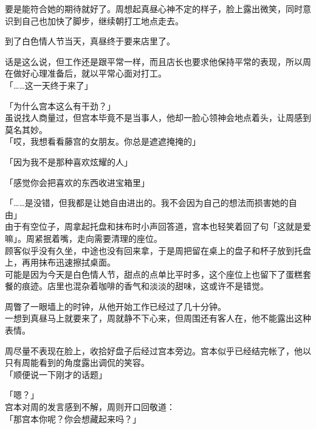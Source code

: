 要是能符合她的期待就好了。周想起真昼心神不定的样子，脸上露出微笑，同时意识到自己也加快了脚步，继续朝打工地点走去。\\

\vspace{2\baselineskip}

到了白色情人节当天，真昼终于要来店里了。

话是这么说，但工作还是跟平常一样，而且店长也要求他保持平常的表现，所以周在做好心理准备后，就以平常心面对打工。\\

「……这一天终于来了」

「为什么宫本这么有干劲？」\\

虽说找人商量过，但宫本毕竟不是当事人，他却一脸心领神会地点着头，让周感到莫名其妙。\\

「哎，我想看看藤宫的女朋友。你总是遮遮掩掩的」

「因为我不是那种喜欢炫耀的人」

「感觉你会把喜欢的东西收进宝箱里」

「……是没错，但我都是让她自由进出的。我不会因为自己的想法而损害她的自由」\\

由于有空位子，周拿起托盘和抹布时小声回答道，宫本也轻笑着回了句「这就是爱嘛」。周紧抿着嘴，走向需要清理的座位。\\

顾客似乎没有久坐，中途也没有回来拿，于是周把留在桌上的盘子和杯子放到托盘上，再用抹布迅速擦拭桌面。\\

可能是因为今天是白色情人节，甜点的点单比平时多，这个座位上也留下了蛋糕套餐的痕迹。店里也混杂着咖啡的香气和淡淡的甜味，这或许不是错觉。

周瞥了一眼墙上的时钟，从他开始工作已经过了几十分钟。\\

一想到真昼马上就要来了，周就静不下心来，但周围还有客人在，他不能露出这种表情。

周尽量不表现在脸上，收拾好盘子后经过宫本旁边。宫本似乎已经结完帐了，他以只有周能看到的角度露出调侃的笑容。\\

「顺便说一下刚才的话题」

「嗯？」\\

宫本对周的发言感到不解，周则开口回敬道：\\

「那宫本你呢？你会想藏起来吗？」

